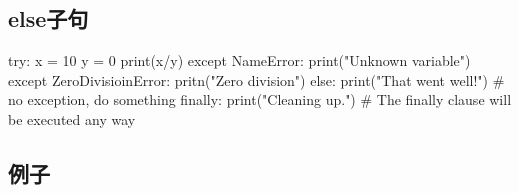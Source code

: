 \subsection{else子句}
\begin{python}
try:
    x = 10
    y = 0
    print(x/y)
except NameError:
    print("Unknown variable")
except ZeroDivisioinError:
    pritn("Zero division")
else:
    print("That went well!")  # no exception, do something
finally:
    print("Cleaning up.")     # The finally clause will be executed any way
\end{python}

\subsection{例子}



